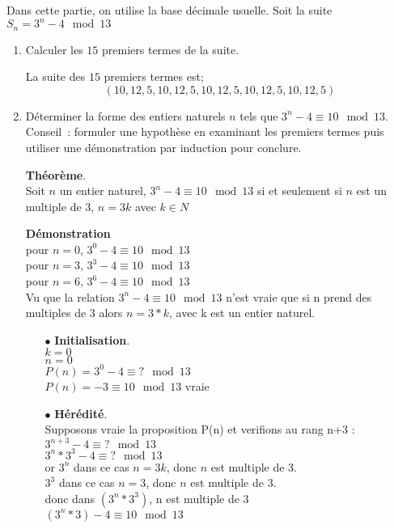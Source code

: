 Dans cette partie, on utilise la base décimale usuelle. Soit la suite $S_n= 3^n -4 \mod{13}$
\begin{enumerate}[1. ]
\item{} Calculer les $15$ premiers termes de la suite.
\begin{framed}
La suite des $15$ premiers termes est;
\[ (10,12,5,10,12,5,10,12,5,10,12,5,10,12,5)\]
\end{framed}
\item{}Déterminer la forme des entiers naturels $n$ tels que $3^n -4\equiv 10\mod{13}$.\\ Conseil~: formuler une hypoth\`ese en examinant les premiers termes puis utiliser une démonstration par induction pour conclure.
\begin{framed}
{\bf Théor\`eme}.\\
Soit $n$ un entier naturel, $3^n-4\equiv 10\mod{13}$ si et seulement si $n$ est un multiple de 3, $n = 3k$ avec $k \in N$

{\bf Démonstration}\\
pour $n=0$, $3^0-4\equiv 10\mod{13}$ \\
pour $n=3$, $3^3-4\equiv 10\mod{13}$ \\
pour $n=6$, $3^6-4\equiv 10\mod{13}$ \\
Vu que la relation $3^n-4\equiv 10\mod{13}$ n'est vraie que si n prend des multiples de 3 alors $n=3*k$, avec k est un entier naturel.


\begin{enumerate}
    \item[$\bullet$] {\bf Initialisation}.\\
    $k=0$ \\
    $n=0$ \\
    $P(n)=3^0-4 \equiv ? \mod{13}$ \\
    $P(n)=-3 \equiv 10 \mod{13}$ vraie
    \item[$\bullet$]  {\bf Hérédité}. \\
    Supposons vraie la proposition P(n) et verifions au rang n+3 :
    $3^{n+3}-4 \equiv ? \mod{13}$ \\
    $3^n*3^3-4\equiv ? \mod{13}$ \\
    or $3^{n}$ dans ce cas $n=3k$, donc $n$ est multiple de 3. \\
       $3^3$ dans ce cas $n=3$, donc $n$ est multiple de 3. \\
    donc dans $(3^{n}*3^3)$, n est multiple de 3\\
    $(3^{n}*3)-4\equiv 10\mod{13}$ \\


\end{enumerate}
\end{framed}
\end{enumerate}
